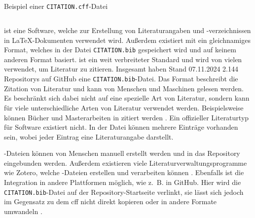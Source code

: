 \begin{listing}
    \inputminted{yaml}{../CITATION.cff}
    \caption{Beispiel einer \texttt{CITATION.cff}-Datei}
    \label{lst:cff_example}
\end{listing}

\subsection{}
\label{subsec:bibtex_format}
 ist eine Software, welche zur Erstellung von Literaturangaben und -verzeichnissen in \LaTeX{}-Dokumenten verwendet wird.
Außerdem existiert mit  ein gleichnamiges Format, welches in der Datei \texttt{CITATION.bib} gespeichert wird und auf keinem anderen Format basiert.
 ist ein weit verbreiteter Standard und wird von vielen verwendet, um Literatur zu zitieren.
Insgesamt haben Stand 07.11.2024 2.144 Repositorys auf GitHub eine \texttt{CITATION.bib}-Datei.
Das Format beschreibt die Zitation von Literatur und kann von Menschen und Maschinen gelesen werden.
Es beschränkt sich dabei nicht auf eine spezielle Art von Literatur, sondern kann für viele unterschiedliche Arten von Literatur verwendet werden.
Beispielsweise können Bücher und Masterarbeiten in  zitiert werden \autocite{patashnik_bibtexing_1988}.
Ein offizieller Literaturtyp für Software existiert nicht.
In der Datei können mehrere Einträge vorhanden sein, wobei jeder Eintrag eine Literaturangabe darstellt.

-Dateien können von Menschen manuell erstellt werden und in das Repository eingebunden werden.
Außerdem existieren viele Literaturverwaltungsprogramme wie Zotero, welche -Dateien erstellen und verarbeiten können \autocite{zotero_zotero_2024}.
Ebenfalls ist die Integration in andere Plattformen möglich, wie z. B. in GitHub.
Hier wird die \texttt{CITATION.bib}-Datei auf der Repository-Startseite verlinkt, sie lässt sich jedoch im Gegensatz zu dem \gls{cff} nicht direkt kopieren oder in andere Formate umwandeln \autocite{github_about_2024-2}.

